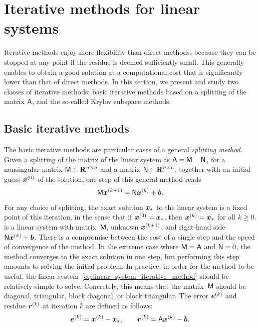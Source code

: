 \section{Iterative methods for linear systems}%
\label{sec:iterative_methods}
Iterative methods enjoy more flexibility than direct methods,
because they can be stopped at any point if the residue is deemed sufficiently small.
This generally enables to obtain a good solution at a computational cost that is significantly lower than that of direct methods.
In this section,
we present and study two classes of iterative methods:
basic iterative methods based on a splitting of the matrix $\mathsf A$,
and the so-called Krylov subspace methods.

\subsection{Basic iterative methods}%
\label{sub:basic_iterative_methods}
The basic iterative methods are particular cases of a general \emph{splitting method}.
Given a splitting of the matrix of the linear system as $\mathsf A = \mathsf M - \mathsf N$,
for a nonsingular matrix $\mathsf M \in \mathbf R^{n \times n}$ and a matrix $\mathsf N \in  \mathbf R^{n \times n}$,
together with an initial guess $\mathbf{\boldsymbol{x}}^{(0)}$ of the solution,
one step of this general method reads
\begin{equation}
    \label{eq:linear_system_iterative_method}
    \mathsf M \mathbf{\boldsymbol{x}}^{(k+1)} = \mathsf N \mathbf{\boldsymbol{x}}^{(k)} + \mathbf{\boldsymbol{b}}.
\end{equation}
For any choice of splitting,
the exact solution $\mathbf{\boldsymbol{x}}_*$ to the linear system is a fixed point of this iteration,
in the sense that if $\mathbf{\boldsymbol{x}}^{(0)} = \mathbf{\boldsymbol{x}}_*$, then $\mathbf{\boldsymbol{x}}^{(k)} = \mathbf{\boldsymbol{x}}_*$ for all $k \geq 0$.
 is a linear system with matrix~$\mathsf M$,
unknown $\mathbf{\boldsymbol{x}}^{(k+1)}$, and right-hand side $\mathsf N \mathbf{\boldsymbol{x}}^{(k)} + \mathbf{\boldsymbol{b}}$.
There is a compromise between the cost of a single step and the speed of convergence of the method.
In the extreme case where $\mathsf M = \mathsf A$ and $\mathsf N = 0$,
the method converges to the exact solution in one step,
but performing this step amounts to solving the initial problem.
In practice, in order for the method to be useful,
the linear system~\eqref{eq:linear_system_iterative_method} should be relatively simple to solve.
Concretely, this means that the matrix~$\mathsf M$ should be diagonal, triangular, block diagonal, or block triangular.
The error $\mathbf{\boldsymbol{e}}^{(k)}$ and residue $\mathbf{\boldsymbol{r}}^{(k)}$ at iteration $k$ are defined as follows:
\[
    \mathbf{\boldsymbol{e}}^{(k)} = \mathbf{\boldsymbol{x}}^{(k)} - \mathbf{\boldsymbol{x}}_*,
    \qquad
    \mathbf{\boldsymbol{r}}^{(k)} = \mathsf A \mathbf{\boldsymbol{x}}^{(k)} - \mathbf{\boldsymbol{b}}.
\]

